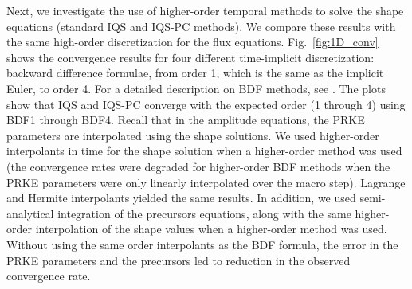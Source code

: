 \documentclass{elsarticle}
\newcommand{\fig}[1]{Fig.~\ref{#1}}                      %
\newcommand{\iqspc}{IQS-PC\xspace}
\begin{document}

Next, we investigate the use of higher-order temporal methods to solve the shape equations (standard IQS and \iqspc methods). We compare these results with the same high-order discretization for the flux equations. 
\fig{fig:1D_conv} shows the convergence results for four different time-implicit discretization: backward difference formulae, from order 1, which is the same as the implicit Euler, to order 4. For a detailed description on BDF methods, see \cite{Gear:2007}. The plots show that IQS and \iqspc converge with the expected order (1 through 4) using BDF1 through BDF4. Recall that in the amplitude equations, the PRKE parameters are interpolated using the shape solutions. We used higher-order interpolants in time for the shape solution when a higher-order method was used (the convergence rates were degraded for higher-order BDF methods when the PRKE parameters were only linearly interpolated over the macro step). Lagrange and Hermite interpolants yielded the same results. In addition, we used semi-analytical integration of the precursors equations, along with the same higher-order interpolation of the shape values when a higher-order method was used. Without using the same order interpolants as the BDF formula, the error in the PRKE parameters and the precursors led to reduction in the observed convergence rate.

\end{document}

